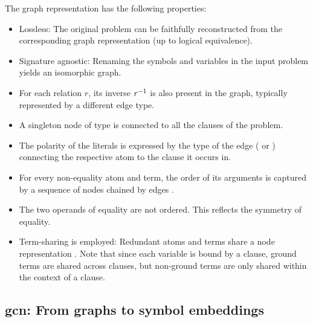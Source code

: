 The graph representation has the following properties:
\begin{itemize}
\item Lossless: The original problem can be faithfully reconstructed from the corresponding graph representation
(up to logical equivalence).
\item Signature agnostic: Renaming the symbols and variables in the input problem yields an isomorphic graph.
\item For each relation $r$, its inverse $r^{-1}$ is also present in the graph,
typically represented by a different edge type.
\item A singleton node of type  is connected to all the clauses of the problem.
\item The polarity of the literals is expressed by the type of the edge (\epos{} or \eneg{})
connecting the respective atom to the clause it occurs in.
\item For every non-equality atom and term, the order of its arguments is captured by a sequence of  nodes chained by edges \cite{Rawson2020}.
\item The two operands of equality are not ordered.
This reflects the symmetry of equality.
\item Term-sharing is employed:
Redundant atoms and terms share a node representation \cite{}.
Note that since each variable is bound by a clause,
ground terms are shared across clauses,
but non-ground terms are only shared within the context of a clause.
\end{itemize}

\subsection{\Gls{gcn}: From graphs to symbol embeddings}

